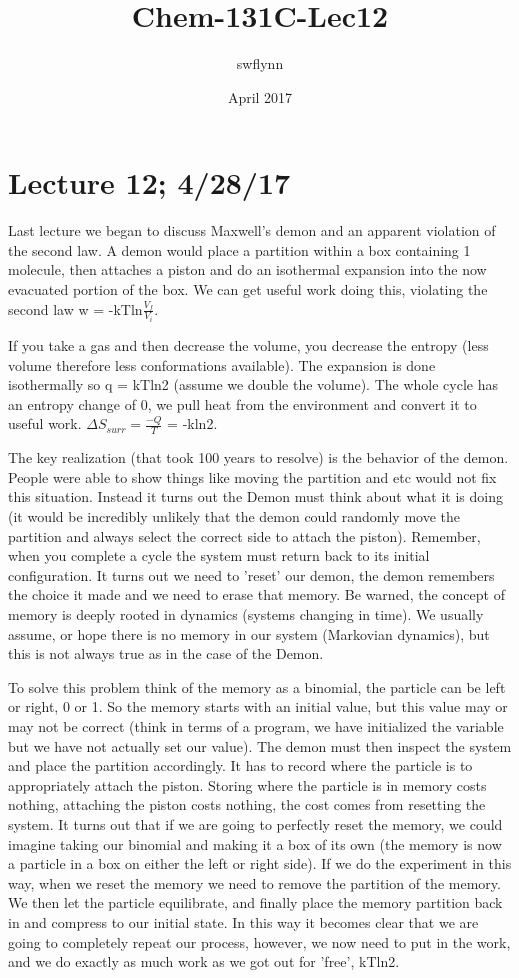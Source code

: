 \documentclass{article}
\title{Chem-131C-Lec12}
\author{swflynn }
\date{April 2017}
\begin{document}
\maketitle

\section*{Lecture 12; 4/28/17}
Last lecture we began to discuss Maxwell's demon and an apparent violation of the second law.
A demon would place a partition within a box containing 1 molecule, then attaches a piston and do an isothermal expansion into the now evacuated portion of the box.
We can get useful work doing this, violating the second law w = -kTln$\frac{V_f}{V_i}$. 

If you take a gas and then decrease the volume, you decrease the entropy (less volume therefore less conformations available). 
The expansion is done isothermally so q = kTln2 (assume we double the volume). 
The whole cycle has an entropy change of 0, we pull heat from the environment and convert it to useful work. 
$\Delta S_{surr} = \frac{-Q}{T}$ = -kln2.

The key realization (that took 100 years to resolve) is the behavior of the demon. 
People were able to show things like moving the partition and etc would not fix this situation. 
Instead it turns out the Demon must think about what it is doing (it would be incredibly unlikely that the demon could randomly move the partition and always select the correct side to attach the piston). 
Remember, when you complete a cycle the system must return back to its initial configuration. 
It turns out we need to 'reset' our demon, the demon remembers the choice it made and we need to erase that memory.
Be warned, the concept of memory is deeply rooted in dynamics (systems changing in time).
We usually assume, or hope there is no memory in our system (Markovian dynamics), but this is not always true as in the case of the Demon. 

To solve this problem think of the memory as a binomial, the particle can be left or right, 0 or 1. 
So the memory starts with an initial value, but this value may or may not be correct (think in terms of a program, we have initialized the variable but we have not actually set our value). 
The demon must then inspect the system and place the partition accordingly.
It has to record where the particle is to appropriately attach the piston. 
Storing where the particle is in memory costs nothing, attaching the piston costs nothing, the cost comes from resetting the system. 
It turns out that if we are going to perfectly reset the memory, we could imagine taking our binomial and making it a box of its own (the memory is now a particle in a box on either the left or right side). 
If we do the experiment in this way, when we reset the memory we need to remove the partition of the memory.
We then let the particle equilibrate, and finally place the memory partition back in and compress to our initial state. 
In this way it becomes clear that we are going to completely repeat our process, however, we now need to put in the work, and we do exactly as much work as we got out for 'free',  kTln2. 
\end{document}

